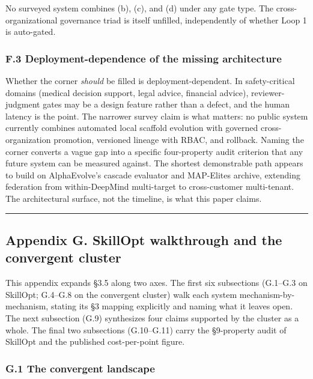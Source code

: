 \documentclass[
]{article}
\begin{document}
No surveyed system combines (b), (c), and (d) under any gate type. The
cross-organizational governance triad is itself unfilled, independently
of whether Loop 1 is auto-gated.

\subsubsection{F.3 Deployment-dependence of the missing
architecture}\label{f.3-deployment-dependence-of-the-missing-architecture}

Whether the corner \emph{should} be filled is deployment-dependent. In
safety-critical domains (medical decision support, legal advice,
financial advice), reviewer-judgment gates may be a design feature
rather than a defect, and the human latency is the point. The narrower
survey claim is what matters: no public system currently combines
automated local scaffold evolution with governed cross-organization
promotion, versioned lineage with RBAC, and rollback. Naming the corner
converts a vague gap into a specific four-property audit criterion that
any future system can be measured against. The shortest demonstrable
path appears to build on AlphaEvolve's cascade evaluator and MAP-Elites
archive, extending federation from within-DeepMind multi-target to
cross-customer multi-tenant. The architectural surface, not the
timeline, is what this paper claims.

\begin{center}\rule{0.5\linewidth}{0.5pt}\end{center}

\subsection{Appendix G. SkillOpt walkthrough and the convergent
cluster}\label{appendix-g.-skillopt-walkthrough-and-the-convergent-cluster}

This appendix expands §3.5 along two axes. The first six subsections
(G.1--G.3 on SkillOpt; G.4--G.8 on the convergent cluster) walk each
system mechanism-by-mechanism, stating its §3 mapping explicitly and
naming what it leaves open. The next subsection (G.9) synthesizes four
claims supported by the cluster as a whole. The final two subsections
(G.10--G.11) carry the §9-property audit of SkillOpt and the published
cost-per-point figure.

\subsubsection{G.1 The convergent
landscape}\label{g.1-the-convergent-landscape}
\end{document}
